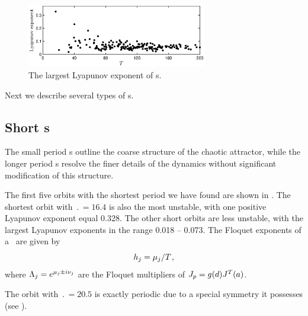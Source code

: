 \begin{figure}[t]
\begin{center}
\includegraphics[width=0.7\textwidth]{figs/ks22_rpos_lyap.eps}
\end{center}
\caption{The largest Lyapunov exponent of \rpo s.
        } \label{f:ks22rposL}
\end{figure}

Next we describe several types of \rpo s.

\subsection{Short \rpo s}  

The small period \rpo s outline the
coarse structure of the chaotic attractor, while the longer period
\rpo s resolve the finer details of the dynamics
without significant modification of this structure.

The first five orbits with the shortest period we have found are
shown in .  The shortest orbit with $\period{} =
16.4$ is also the most unstable, with one positive Lyapunov exponent
equal 0.328.  The other short orbits are less unstable, with the
largest Lyapunov exponents in the range 0.018 -- 0.073.  The
Floquet exponents of a \rpo\ are given by 
\[
h_j = \eigRe[j]/\period{}
\,,
\]
where $\ExpaEig_j = e^{\eigRe[j] \pm i \eigIm[j]}$ are the 
Floquet multipliers of $\jMps_p = g(\shift)J^T(a)$.  


The
orbit with $\period{} = 20.5$ is exactly periodic due to a special symmetry
it possesses (see ).


